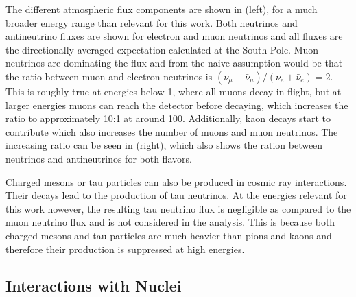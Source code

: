 The different atmospheric flux components are shown in  (left), for a much broader energy range than relevant for this work. Both neutrinos and antineutrino fluxes are shown for electron  and muon neutrinos and all fluxes are the directionally averaged expectation calculated at the South Pole. Muon neutrinos are dominating the flux and from  the naive assumption would be that the ratio between muon and electron neutrinos is $(\nu_\mu+\bar{\nu}_\mu)/(\nu_e+\bar{\nu}_e)=2$. This is roughly true at energies below \SI{1}{\gev}, where all muons decay in flight, but at larger energies muons can reach the detector before decaying, which increases the ratio to approximately 10:1 at around \SI{100}{\gev}. Additionally, kaon decays start to contribute which also increases the number of muons and muon neutrinos. The increasing ratio can be seen in  (right), which also shows the ration between neutrinos and antineutrinos for both flavors.

Charged mesons or tau particles can also be produced in cosmic ray interactions. Their decays lead to the production of tau neutrinos. At the energies relevant for this work however, the resulting tau neutrino flux is negligible as compared to the muon neutrino flux  and is not considered in the analysis. This is because both charged mesons and tau particles are much heavier than pions and kaons and therefore their production is suppressed at high energies.


\subsection{Interactions with Nuclei}

